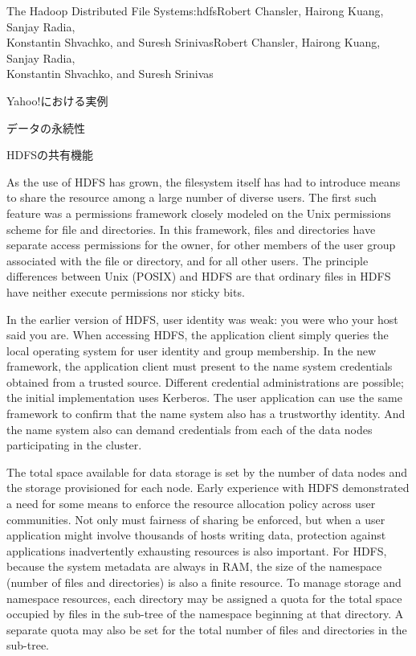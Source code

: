 \begin{aosachaptertoc}{The Hadoop Distributed File System}{s:hdfs}{Robert Chansler, Hairong Kuang, Sanjay Radia, \\ Konstantin Shvachko, and Suresh Srinivas}{Robert Chansler, Hairong Kuang, Sanjay Radia, \\ \hspace*{0.9cm} Konstantin Shvachko, and Suresh Srinivas}
\begin{aosasect1}{Yahoo!における実例}
\begin{aosasect2}{データの永続性}
\end{aosasect2}

\begin{aosasect2}{HDFSの共有機能}

As the use of HDFS has grown, the filesystem itself has had to
introduce means to share the resource among a large number of diverse users. 
The first such feature was a permissions framework closely
modeled on the Unix permissions scheme for file and directories. In
this framework, files and directories have separate access permissions
for the owner, for other members of the user group associated with the
file or directory, and for all other users. The principle differences
between Unix (POSIX) and HDFS are that ordinary files in HDFS have
neither execute permissions nor sticky bits.

In the earlier version of HDFS, user identity was weak: you were who
your host said you are. When accessing HDFS, the application client
simply queries the local operating system for user identity and group
membership. In the new framework, the application client must present
to the name system credentials obtained from a trusted
source. Different credential administrations are possible; the initial
implementation uses Kerberos.  The user application can use the same
framework to confirm that the name system also has a trustworthy
identity. And the name system also can demand credentials from each of
the data nodes participating in the cluster.

The total space available for data storage is set by the number of
data nodes and the storage provisioned for each node. Early experience
with HDFS demonstrated a need for some means to enforce the resource
allocation policy across user communities. Not only must fairness of
sharing be enforced, but when a user application might involve
thousands of hosts writing data, protection against applications
inadvertently exhausting resources is also important. For HDFS,
because the system metadata are always in RAM, the size of the
namespace (number of files and directories) is also a finite
resource. To manage storage and namespace resources, each directory
may be assigned a quota for the total space occupied by files in the
sub-tree of the namespace beginning at that directory. A separate
quota may also be set for the total number of files and directories in
the sub-tree.


\end{aosasect2}
\end{aosasect1}
\end{aosachaptertoc}
